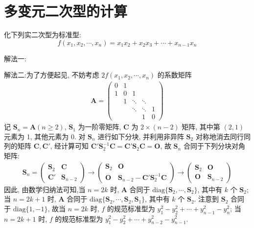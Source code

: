 \documentclass[../../main.tex]{subfiles}
\begin{document}
\section{多变元二次型的计算}

\begin{example}
化下列实二次型为标准型:
\[f(x_1,x_2,\cdots,x_n)=x_1x_2 + x_2x_3 + \cdots + x_{n - 1}x_n\]
\end{example}
\begin{solution}
{\color{blue}解法一:}

{\color{blue}解法二:}为了方便起见, 不妨考虑 \(2f(x_1,x_2,\cdots,x_n)\) 的系数矩阵
\begin{align*}
\boldsymbol{A} = \begin{pmatrix}
0 & 1 & & & \\
1 & 0 & 1 & & \\
& 1 & \ddots & \ddots & \\
& & \ddots & \ddots & 1 \\
& & & 1 & 0
\end{pmatrix}
\end{align*}
记 \(\boldsymbol{S}_n = \boldsymbol{A}(n\geqslant 2)\), \(\boldsymbol{S}_1\) 为一阶零矩阵, \(\boldsymbol{C}\) 为 \(2\times(n - 2)\) 矩阵, 其中第 \((2,1)\) 元素为 1, 其他元素为 0. 对 \(\boldsymbol{S}_n\) 进行如下分块, 并利用非异阵 \(\boldsymbol{S}_2\) 对称地消去同行同列的矩阵 \(\boldsymbol{C},\boldsymbol{C}'\), 经计算可知 \(\boldsymbol{C}'\boldsymbol{S}_2^{-1}\boldsymbol{C} = \boldsymbol{C}'\boldsymbol{S}_2\boldsymbol{C} = \boldsymbol{O}\), 故 \(\boldsymbol{S}_n\) 合同于下列分块对角矩阵:
\begin{align*}
\boldsymbol{S}_n = \begin{pmatrix}
\boldsymbol{S}_2 & \boldsymbol{C} \\
\boldsymbol{C}' & \boldsymbol{S}_{n - 2}
\end{pmatrix} \to
\begin{pmatrix}
\boldsymbol{S}_2 & \boldsymbol{O} \\
\boldsymbol{O} & \boldsymbol{S}_{n - 2} - \boldsymbol{C}'\boldsymbol{S}_2^{-1}\boldsymbol{C}
\end{pmatrix} \to
\begin{pmatrix}
\boldsymbol{S}_2 & \boldsymbol{O} \\
\boldsymbol{O} & \boldsymbol{S}_{n - 2}
\end{pmatrix}
\end{align*}
因此, 由数学归纳法可知,当 \(n = 2k\) 时, \(\boldsymbol{A}\) 合同于 \(\mathrm{diag}\{\boldsymbol{S}_2,\cdots,\boldsymbol{S}_2\}\), 其中有 \(k\) 个 \(\boldsymbol{S}_2\); 当 \(n = 2k + 1\) 时, \(\boldsymbol{A}\) 合同于 \(\mathrm{diag}\{\boldsymbol{S}_2,\cdots,\boldsymbol{S}_2,\boldsymbol{S}_1\}\), 其中有 \(k\) 个 \(\boldsymbol{S}_2\). 注意到 \(\boldsymbol{S}_2\) 合同于 \(\mathrm{diag}\{1, - 1\}\), 故当 \(n = 2k\) 时, \(f\) 的规范标准型为 \(y_1^2 - y_2^2 + \cdots + y_{n - 1}^2 - y_n^2\); 当 \(n = 2k + 1\) 时, \(f\) 的规范标准型为 \(y_1^2 - y_2^2 + \cdots + y_{n - 2}^2 - y_{n - 1}^2\). 

\end{solution}
\end{document}
